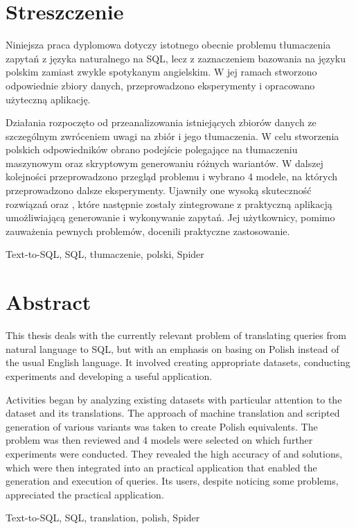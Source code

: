 \section*{Streszczenie}
\vspace{1cm}

Niniejsza praca dyplomowa dotyczy istotnego obecnie problemu tłumaczenia zapytań z języka naturalnego na SQL, lecz z zaznaczeniem bazowania na języku polskim zamiast zwykle spotykanym angielskim. W jej ramach stworzono odpowiednie zbiory danych, przeprowadzono eksperymenty i opracowano użyteczną aplikację.

Działania rozpoczęto od przeanalizowania istniejących zbiorów danych ze szczególnym zwróceniem uwagi na zbiór  i jego tłumaczenia. W celu stworzenia polskich odpowiedników obrano podejście polegające na tłumaczeniu maszynowym oraz skryptowym generowaniu różnych wariantów. W dalszej kolejności przeprowadzono przegląd problemu  i wybrano 4 modele, na których przeprowadzono dalsze eksperymenty. Ujawniły one wysoką skuteczność rozwiązań  oraz , które następnie zostały zintegrowane z praktyczną aplikacją umożliwiającą generowanie i wykonywanie zapytań. Jej użytkownicy, pomimo zauważenia pewnych problemów, docenili praktyczne zastosowanie.

\vspace{1cm}
Text-to-SQL, SQL, tłumaczenie, polski, Spider
\clearpage

\section*{Abstract}
\vspace{1cm}

This thesis deals with the currently relevant problem of translating queries from natural language to SQL, but with an emphasis on basing on Polish instead of the usual English language. It involved creating appropriate datasets, conducting experiments and developing a useful application.

Activities began by analyzing existing datasets with particular attention to the  dataset and its translations. The approach of machine translation and scripted generation of various variants was taken to create Polish equivalents. The  problem was then reviewed and 4 models were selected on which further experiments were conducted. They revealed the high accuracy of  and  solutions, which were then integrated into an practical application that enabled the generation and execution of queries. Its users, despite noticing some problems, appreciated the practical application.

\vspace{1cm}
Text-to-SQL, SQL, translation, polish, Spider
\clearpage
